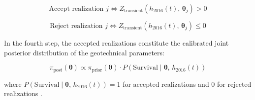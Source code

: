 $$\text{Accept realization } j \iff Z_\mathrm{transient}\!\left(h_{2016}(t),\, \boldsymbol{\theta}_j\right) > 0$$

$$\text{Reject realization } j \iff Z_\mathrm{transient}\!\left(h_{2016}(t),\, \boldsymbol{\theta}_j\right) \leq 0$$

In the fourth step, the accepted realizations constitute the calibrated joint posterior distribution of the geotechnical parameters:

$$\pi_\mathrm{post}(\boldsymbol{\theta}) \propto \pi_\mathrm{prior}(\boldsymbol{\theta}) \cdot P\!\left(\mathrm{Survival}\mid \boldsymbol{\theta},\, h_{2016}(t)\right)$$

where $P(\mathrm{Survival}\mid \boldsymbol{\theta},\, h_{2016}(t)) = 1$ for accepted realizations and $0$ for rejected realizations \parencite{schweckendiek_2014, hkv_2023}.

